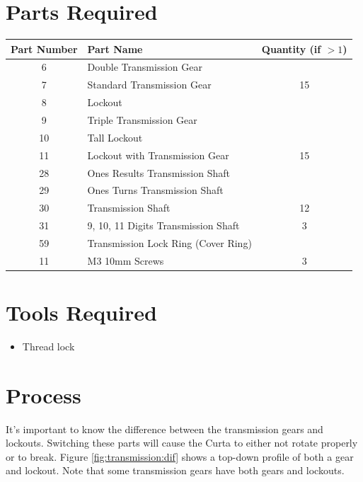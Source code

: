 \documentclass[openany]{book}
\begin{document}
\section{Parts Required}
\begin{table}[!ht]
	\centering
	\begin{tabular}{clc}
		Part Number & Part Name & Quantity (if $>1$) \\ \hline
		6 & Double Transmission Gear &  \\
		7 & Standard Transmission Gear & 15 \\
		8 & Lockout &  \\
		9 & Triple Transmission Gear & \\
		10 & Tall Lockout & \\
		11 & Lockout with Transmission Gear & 15 \\
		28 & Ones Results Transmission Shaft & \\
		29 & Ones Turns Transmission Shaft & \\
		30 & Transmission Shaft & 12 \\
		31 & 9, 10, 11 Digits Transmission Shaft & 3 \\
		59 & Transmission Lock Ring (Cover Ring) & \\ \hline \hline
		11 & M3 10mm Screws & 3
	\end{tabular}
\end{table}

\section{Tools Required}
\begin{itemize} 
	\item Thread lock
\end{itemize}

\section{Process}
It's important to know the difference between the transmission gears and lockouts. Switching these
parts will cause the Curta to either not rotate properly or to break. Figure \ref{fig:transmission:dif}
shows a top-down profile of both a gear and lockout. Note that some transmission gears have both
gears and lockouts. 
\end{document}
